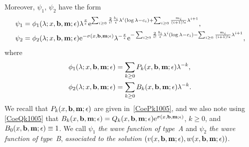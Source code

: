 \documentclass[pdftex]{sigma}
\newcommand{\e}{\epsilon}
\numberwithin{equation}{section}
\begin{document}
Moreover, $\psi_1$, $\psi_2$ have the form
\begin{align}
&\psi_1 = \phi_1(\lambda; x, {\bf b}, {\bf m};\e) \lambda^{\frac{x}\e}
 {\rm e}^{\sum_{i\ge0} \frac{2}{i!} \frac{b_i}{\e} \lambda^i (\log \lambda-c_i)+\sum_{i\ge0} \frac{m_i}{(i+1)! \e} \lambda^{i+1}} , \label{psiphiform1} \\
&\psi_2 = \phi_2(\lambda; x, {\bf b}, {\bf m};\e) {\rm e}^{-\sigma(x,{\bf b},{\bf m};\e)} \lambda^{-\frac{x}\e}
 {\rm e}^{-\sum_{i\ge0} \frac{2}{i!} \frac{b_i}{\e} \lambda^i (\log \lambda-c_i)-\sum_{i\ge0} \frac{m_i}{(i+1)! \e} \lambda^{i+1}} , \label{psiphiform2}
\end{align}
where
\begin{align}
& \phi_1(\lambda; x, {\bf b}, {\bf m};\e) =\sum_{k\ge0} P_k(x, {\bf b}, {\bf m};\e) \lambda^{-k}, \label{phiexpansion1}\\
& \phi_2(\lambda; x, {\bf b}, {\bf m};\e) =\sum_{k\ge0} B_k(x, {\bf b}, {\bf m};\e) \lambda^{-k}. \label{phiexpansion2}
\end{align}
We recall that $P_k(x, {\bf b}, {\bf m};\e)$ are given in~\eqref{CoePk1005},
and we also note using \eqref{CoeQk1005} that $B_k(x, {\bf b}, {\bf m};\e)=Q_k(x, {\bf b},{\bf m};\e) {\rm e}^{\sigma(x, {\bf b},{\bf m};\e)}$, $k\geq 0$,
and $B_0(x, {\bf b}, {\bf m};\e)\equiv 1$.
We call $\psi_1$ {\it the wave function of type~A} and $\psi_2$ {\it the wave function of type~B},
{\it associated to the solution $(v(x, {\bf b}, {\bf m};\e), w(x, {\bf b}, {\bf m};\e))$}.
\end{document}
